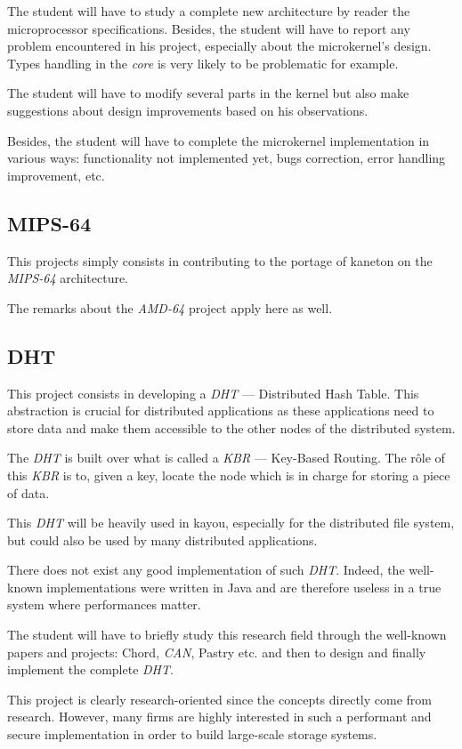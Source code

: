 \begin{multicols}{2}
The student will have to study a complete new architecture by reader the
microprocessor specifications. Besides, the student will have to report
any problem encountered in his project, especially about the microkernel's
design. Types handling in the \textit{core} is very likely to be problematic
for example.

The student will have to modify several parts in the kernel but also
make suggestions about design improvements based on his observations.

Besides, the student will have to complete the microkernel implementation
in various ways: functionality not implemented yet, bugs correction, error
handling improvement, etc.

%
%

\subsection{MIPS-64}

This projects simply consists in contributing to the portage of kaneton
on the \textit{MIPS-64} architecture.

The remarks about the \textit{AMD-64} project apply here as well.

%
%

\subsection{DHT}

This project consists in developing a \textit{DHT} --- Distributed Hash Table.
This abstraction is crucial for distributed applications as these applications
need to store data and make them accessible to the other nodes of the
distributed system.

The \textit{DHT} is built over what is called a \textit{KBR} --- Key-Based
Routing. The r\^ole of this \textit{KBR} is to, given a key, locate the
node which is in charge for storing a piece of data.

This \textit{DHT} will be heavily used in kayou, especially for the distributed
file system, but could also be used by many distributed applications.

There does not exist any good implementation of such \textit{DHT}. Indeed,
the well-known implementations were written in Java and are therefore
useless in a true system where performances matter.

The student will have to briefly study this research field through the
well-known papers and projects: Chord, \textit{CAN}, Pastry etc. and then
to design and finally implement the complete \textit{DHT}.

This project is clearly research-oriented since the concepts directly come
from research. However, many firms are highly interested in such a
performant and secure implementation in order to build large-scale storage
systems.

\end{multicols}



